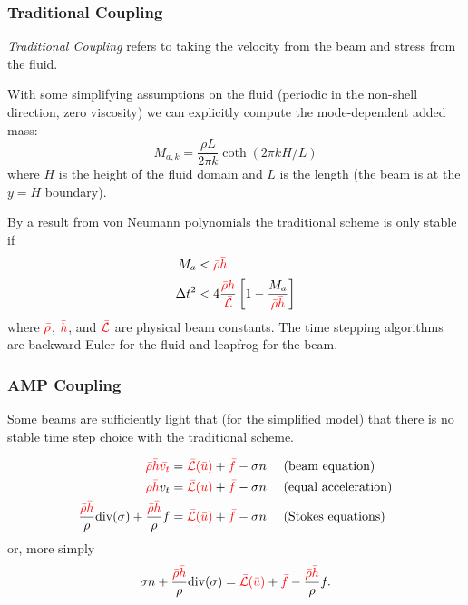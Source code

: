 \documentclass[8pt]{beamer}
\newcommand{\leftd}[1]{{\color{red} \bar{#1}}}
\newcommand{\leftdd}[2]{{\color{red} \bar{#1}(\bar{#2})}}
\newcommand{\divergence}{\mathrm{div}}
\begin{document}
\begin{frame}
    \frametitle{Traditional Coupling}
    \emph{Traditional Coupling} refers to taking the velocity from the beam and
    stress from the fluid.

    With some simplifying assumptions on the fluid (periodic in the non-shell
    direction, zero viscosity) we can explicitly compute the mode-dependent
    added mass:
    \begin{equation}
        M_{a,k} = \dfrac{\rho L}{2 \pi k} \coth(2 \pi k H / L)
    \end{equation}
    where \(H\) is the height of the fluid domain and \(L\) is the length (the
    beam is at the \(y = H\) boundary).

    \pause
    By a result from von Neumann polynomials the traditional scheme is only
    stable if
    \begin{align}
        M_a &< \leftd{\rho} \leftd{h}                                         \\
        \Delta t^2 &< 4 \dfrac{\leftd{\rho} \leftd{h}}{\leftd{\mathcal{L}}}
        \left[1 - \dfrac{M_a}{\leftd{\rho} \leftd{h}}\right]
    \end{align}
    where \(\leftd{\rho}\), \(\leftd{h}\), and \(\leftd{\mathcal{L}}\) are
    physical beam constants. The time stepping algorithms are backward Euler for
    the fluid and leapfrog for the beam.
\end{frame}

\begin{frame}
    \frametitle{AMP Coupling}
    Some beams are sufficiently light that (for the simplified model) that there
    is no stable time step choice with the traditional scheme.

    \begin{align}
        \leftd{\rho} \leftd{h} \leftd{v_t}
        &= \leftdd{\mathcal{L}}{u} + \leftd{f} - \sigma n
        \quad \text{ (beam equation)}                                         \\
        \leftd{\rho} \leftd{h} v_t
        &= \leftdd{\mathcal{L}}{u} + \leftd{f} - \sigma n
        \quad \text{ (equal acceleration)}                                    \\
        \dfrac{\leftd{\rho} \leftd{h}}{\rho} \divergence(\sigma)
        + \dfrac{\leftd{\rho} \leftd{h}}{\rho} f
        &= \leftdd{\mathcal{L}}{u} + \leftd{f} - \sigma n
        \quad \text{ (Stokes equations)}
    \end{align}
    or, more simply
    \begin{equation}
        \sigma n + \dfrac{\leftd{\rho} \leftd{h}}{\rho} \divergence(\sigma)
        = \leftdd{\mathcal{L}}{u}
        + \leftd{f}
        - \dfrac{\leftd{\rho} \leftd{h}}{\rho} f.
    \end{equation}
\end{frame}
\end{document}
